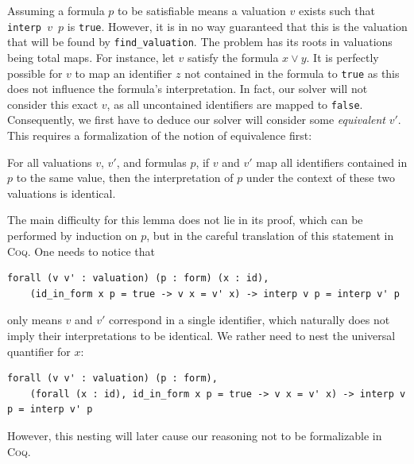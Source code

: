 Assuming a formula $p$ to be satisfiable means a valuation $v$ exists such that \texttt{interp $v$ $p$} is \texttt{true}.
However, it is in no way guaranteed that this is the valuation that will be found by \texttt{find\_valuation}.
The problem has its roots in valuations being total maps.
For instance, let $v$ satisfy the formula $x \lor y$.
It is perfectly possible for $v$ to map an identifier $z$ not contained in the formula to \texttt{true} as this does not influence the formula's interpretation.
In fact, our solver will not consider this exact $v$, as all uncontained identifiers are mapped to \texttt{false}.
Consequently, we first have to deduce our solver will consider some \emph{equivalent} $v'$.
This requires a formalization of the notion of equivalence first:
\begin{lemma}\label{lem:interp_eq}
    For all valuations $v$, $v'$, and formulas $p$, if $v$ and $v'$ map all identifiers contained in $p$ to the same value, then the interpretation of $p$ under the context of these two valuations is identical.
\end{lemma}
The main difficulty for this lemma does not lie in its proof, which can be performed by induction on $p$, but in the careful translation of this statement in \textsc{Coq}.
One needs to notice that
\begin{lstlisting}[language=coq]
forall (v v' : valuation) (p : form) (x : id),
    (id_in_form x p = true -> v x = v' x) -> interp v p = interp v' p
\end{lstlisting}
only means $v$ and $v'$ correspond in a single identifier, which naturally does not imply their interpretations to be identical.
We rather need to nest the universal quantifier for $x$:
\begin{lstlisting}[language=coq]
forall (v v' : valuation) (p : form),
    (forall (x : id), id_in_form x p = true -> v x = v' x) -> interp v p = interp v' p
\end{lstlisting}
However, this nesting will later cause our reasoning not to be formalizable in \textsc{Coq}.

